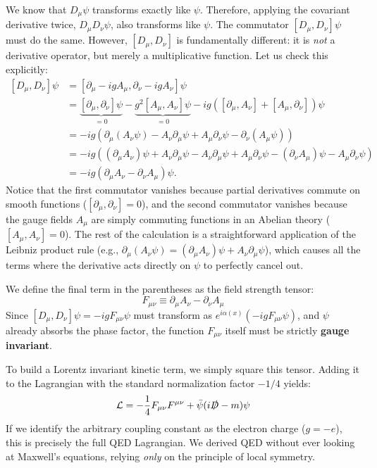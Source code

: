 We know that $D_\mu \psi$ transforms exactly like $\psi$. Therefore, applying the covariant derivative twice, $D_\mu D_\nu \psi$, also transforms like $\psi$. The commutator $[D_\mu, D_\nu]\psi$ must do the same. However, $[D_\mu, D_\nu]$ is fundamentally different: it is \textit{not} a derivative operator, but merely a multiplicative function. Let us check this explicitly:
\[
    \begin{aligned}
        [D_\mu, D_\nu]\psi & = [\partial_\mu - igA_\mu, \partial_\nu - igA_\nu]\psi                                                                                                                           \\
                           & = \underbrace{[\partial_\mu, \partial_\nu]\psi}_{=0} - \underbrace{g^2[A_\mu, A_\nu]\psi}_{=0} - ig([\partial_\mu, A_\nu] + [A_\mu, \partial_\nu])\psi                           \\
                           & = -ig \left( \partial_\mu(A_\nu \psi) - A_\nu \partial_\mu \psi + A_\mu \partial_\nu \psi - \partial_\nu(A_\mu \psi) \right)                                                     \\
                           & = -ig \left( (\partial_\mu A_\nu)\psi + A_\nu \partial_\mu \psi - A_\nu \partial_\mu \psi + A_\mu \partial_\nu \psi - (\partial_\nu A_\mu)\psi - A_\mu \partial_\nu \psi \right) \\
                           & = -ig(\partial_\mu A_\nu - \partial_\nu A_\mu)\psi.
    \end{aligned}
\]
Notice that the first commutator vanishes because partial derivatives commute on smooth functions ($[\partial_\mu, \partial_\nu] = 0$), and the second commutator vanishes because the gauge fields $A_\mu$ are simply commuting functions in an Abelian theory ($[A_\mu, A_\nu] = 0$). The rest of the calculation is a straightforward application of the Leibniz product rule (e.g., $\partial_\mu(A_\nu \psi) = (\partial_\mu A_\nu)\psi + A_\nu \partial_\mu \psi$), which causes all the terms where the derivative acts directly on $\psi$ to perfectly cancel out.

We define the final term in the parentheses as the field strength tensor:
\[
    F_{\mu\nu} \equiv \partial_\mu A_\nu - \partial_\nu A_\mu
\]
Since $[D_\mu, D_\nu]\psi = -ig F_{\mu\nu} \psi$ must transform as $e^{i\alpha(x)} (-ig F_{\mu\nu} \psi)$, and $\psi$ already absorbs the phase factor, the function $F_{\mu\nu}$ itself must be strictly \textbf{gauge invariant}.

To build a Lorentz invariant kinetic term, we simply square this tensor. Adding it to the Lagrangian with the standard normalization factor $-1/4$ yields:
\[
    \mathcal{L} = -\frac{1}{4}F_{\mu\nu}F^{\mu\nu} + \bar{\psi}(i\slashed{D} - m)\psi
\]
If we identify the arbitrary coupling constant as the electron charge ($g = -e$), this is precisely the full QED Lagrangian. We derived QED without ever looking at Maxwell's equations, relying \textit{only} on the principle of local symmetry.

